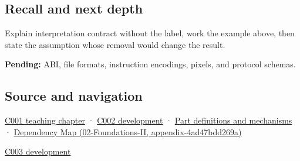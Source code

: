 \subsection{Recall and next depth}\label{appendix-f414bd4ed05c-recall-and-next-depth}

Explain interpretation contract without the label, work the example above, then state the assumption whose removal would change the result.

\textbf{Pending:} ABI, file formats, instruction encodings, pixels, and protocol schemas.

\subsection{Source and navigation}\label{appendix-f414bd4ed05c-source-and-navigation}

\hyperref[01-foundations-i-ch001-from-a-signal-to-an-interpretation]{C001 teaching chapter} · \hyperref[01-foundations-i-ch001-arithmetic-becomes-a-policy]{C002 development} · \hyperref[appendix-fd090d982a15]{Part definitions and mechanisms} · \href{../02-Foundations-II/main.pdf\#nameddest=appendix-4ad47bdd269a}{Dependency Map (02-Foundations-II, appendix-4ad47bdd269a)}

\hyperref[01-foundations-i-ch002-where-the-bytes-live]{C003 development}
